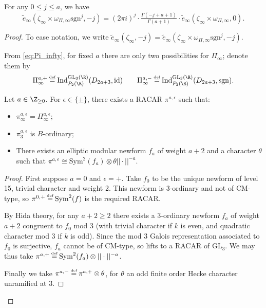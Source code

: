 \documentclass[10pt,reqno,a4paper]{amsart}
\newcommand{\GL}{\mathrm{GL}}
\begin{document}
\begin{proposition}\label{prop:ratio}
	For any $0 \leq j \leq a$, we have
	\[
		\widetilde{e}_\infty(\zeta_\infty \times \omega_{\Pi,\infty}\mathrm{sgn}^j,-j) = (2\pi i)^{j} \cdot \tfrac{\Gamma(-j+a+1)}{\Gamma(a+1)} \cdot \widetilde{e}_\infty(\zeta_\infty\times \omega_{\Pi,\infty},0).
	\]
\end{proposition}

\begin{proof}
	 To ease notation, we write $\widetilde{e}_\infty(\zeta_\infty,-j) = \widetilde{e}_\infty(\zeta_\infty \times \omega_{\Pi,\infty}\mathrm{sgn}^j,-j)$. 
	
From \eqref{eq:Pi_infty}, for fixed $a$ there are only two possibilities for $\Pi_\infty$; denote them by
\[
\Pi_\infty^{a,+} \defeq \mathrm{Ind}_{P_2(\R)}^{\GL_3(\R)} (D_{2a+3}, \mathrm{id}) \qquad \Pi_\infty^{a,-} \defeq \mathrm{Ind}_{P_2(\R)}^{\GL_3(\R)} (D_{2a+3}, \mathrm{sgn}).
\]

\begin{lemma}
	Let $a \in \Z_{\geq 0}$. For $\epsilon \in \{\pm\}$, there exists a RACAR $\pi^{a,\epsilon}$ such that:
	\begin{itemize}
		\item[(i)] $\pi^{a,\epsilon}_\infty = \Pi_{\infty}^{a,\epsilon}$;
		\item[(ii)] $\pi^{a,\epsilon}_3$ is $B$-ordinary;
		\item[(iii)] There exists an elliptic modular newform $f_a$ of weight $a+2$ and a character $\theta$ such that $\pi^{a,\epsilon} \cong \mathrm{Sym}^2(f_a)\otimes \theta||\cdot||^{-a}$.
	\end{itemize}
\end{lemma}
\begin{proof}
	First suppose $a = 0$ and $\epsilon = +$. Take $f_0$ to be the unique newform of level 15, trivial character and weight 2. This newform is 3-ordinary and not of CM-type, so $\pi^{0,+} \defeq \mathrm{Sym}^2(f)$ is the required RACAR.

	By Hida theory, for any $a+2 \ge 2$ there exists a 3-ordinary newform $f_a$ of weight $a+2$ congruent to $f_0$ mod 3 (with trivial character if $k$ is even, and quadratic character mod 3 if $k$ is odd). Since the mod 3 Galois representation associated to $f_0$ is surjective, $f_a$ cannot be of CM-type, so lifts to a RACAR of $\GL_3$. We may thus take $\pi^{a,+}\defeq \mathrm{Sym}^2(f_a)\otimes||\cdot||^{-a}$.

	Finally we take $\pi^{a,-} \defeq \pi^{a,+} \otimes \theta$, for $\theta$ an odd finite order Hecke character unramified at $3$.
\end{proof}



\end{proof}
\end{document}
